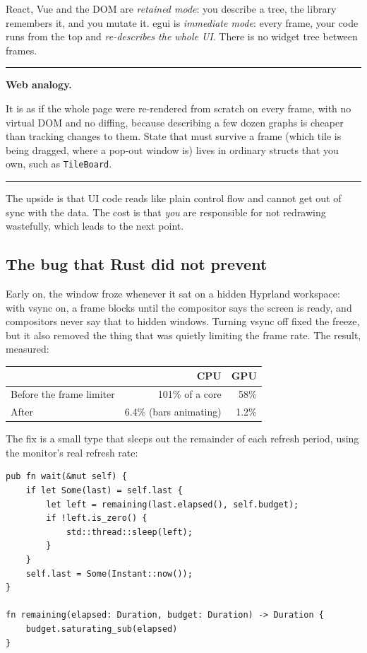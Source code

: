 \documentclass[11pt,a4paper]{article}
\newcommand{\code}[1]{\texttt{#1}}
\newcommand{\file}[1]{\texttt{#1}}
\newenvironment{callout}[1]{%
  \par\medskip\noindent\hrule\vspace{0.4em}\noindent\small\textbf{#1.}\ \ignorespaces
}{%
  \par\vspace{0.3em}\noindent\hrule\medskip
}
\begin{document}
React, Vue and the DOM are \emph{retained mode}: you describe a tree, the library remembers it,
and you mutate it. egui is \emph{immediate mode}: every frame, your code runs from the top and
\emph{re-describes the whole UI}. There is no widget tree between frames.

\begin{callout}{Web analogy}
It is as if the whole page were re-rendered from scratch on every frame, with no virtual DOM
and no diffing, because describing a few dozen graphs is cheaper than tracking changes to
them. State that must survive a frame (which tile is being dragged, where a pop-out window is)
lives in ordinary structs that you own, such as \code{TileBoard}.
\end{callout}

The upside is that UI code reads like plain control flow and cannot get out of sync with the
data. The cost is that \emph{you} are responsible for not redrawing wastefully, which leads to
the next point.

\subsection{The bug that Rust did not prevent}

Early on, the window froze whenever it sat on a hidden Hyprland workspace: with vsync on, a
frame blocks until the compositor says the screen is ready, and compositors never say that to
hidden windows. Turning vsync off fixed the freeze, but it also removed the thing that was
quietly limiting the frame rate. The result, measured:

\begin{center}
\begin{tabular}{lrr}
\toprule
 & CPU & GPU \\
\midrule
Before the frame limiter & 101\% of a core & 58\% \\
After & 6.4\% (bars animating) & 1.2\% \\
\bottomrule
\end{tabular}
\end{center}

The fix is a small type that sleeps out the remainder of each refresh period, using the
monitor's real refresh rate:

\begin{lstlisting}[caption={\file{frame\_limit.rs}.}]
pub fn wait(&mut self) {
    if let Some(last) = self.last {
        let left = remaining(last.elapsed(), self.budget);
        if !left.is_zero() {
            std::thread::sleep(left);
        }
    }
    self.last = Some(Instant::now());
}

fn remaining(elapsed: Duration, budget: Duration) -> Duration {
    budget.saturating_sub(elapsed)
}
\end{lstlisting}
\end{document}
